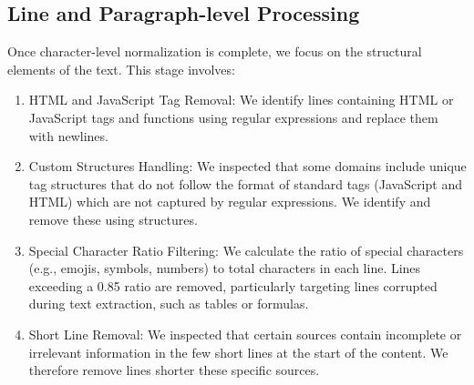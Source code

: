 \subsection{Line and Paragraph-level Processing}
Once character-level normalization is complete, we focus on the structural elements of the text. This stage involves:
\begin{enumerate}
    \item HTML and JavaScript Tag Removal: We identify lines containing HTML or JavaScript tags and functions using regular expressions and replace them with newlines.

    \item Custom Structures Handling: We inspected that some domains include unique tag structures that do not follow the format of standard tags (JavaScript and HTML) which are not captured by regular expressions. We identify and remove these using structures. 

    \item Special Character Ratio Filtering: We calculate the ratio of special characters (e.g., emojis, symbols, numbers) to total characters in each line. Lines exceeding a 0.85 ratio are removed, particularly targeting lines corrupted during text extraction, such as tables or formulas.

    \item Short Line Removal: We inspected that certain sources contain incomplete or irrelevant information in the few short lines at the start of the content. We therefore remove lines shorter these specific sources.
\end{enumerate}

